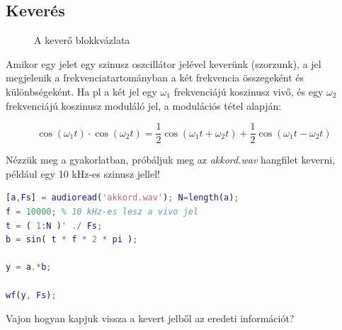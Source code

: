 \documentclass[12pt,a4paper]{article}
\begin{document}
\clearpage

\subsection{Keverés}


\begin{figure}[H]
\label{fig:keverok}
\centering
{}
\caption{
A keverő blokkvázlata} 
\end{figure}

Amikor egy jelet egy szinusz oszcillátor jelével keverünk (szorzunk), a jel megjelenik a frekvenciatartományban a két frekvencia összegeként és különbségeként. Ha pl a két jel egy $\omega_1$ frekvenciájú koszinusz vivő, és egy $\omega_2$ frekvenciájú koszinusz moduláló jel, a modulációs tétel alapján:

\begin{equation}
\cos(\omega_1t) \cdot \cos(\omega_2t) = \frac{1}{2}\cos(\omega_1t+\omega_2t) +  \frac{1}{2}\cos(\omega_1t - \omega_2t)
\end{equation}

Nézzük meg a gyakorlatban, próbáljuk meg az \textit{akkord.wav} hangfilet keverni, például egy 10 kHz-es szinusz jellel!


\begin{lstlisting}[frame=single,language=matlab,caption=Keverés]
[a,Fs] = audioread('akkord.wav'); N=length(a);
f = 10000; % 10 kHz-es lesz a vivo jel
t = ( 1:N )' ./ Fs;
b = sin( t * f * 2 * pi );

y = a.*b;

wf(y, Fs);
\end{lstlisting}

Vajon hogyan kapjuk vissza a kevert jelből az eredeti információt?
\end{document}
